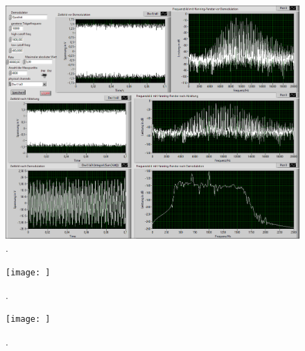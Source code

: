 \documentclass[
a4paper,
12pt,
pagesize,
ngerman
]{scrartcl}
\begin{document}
	\begin{figure}[h]
		\centering
		\includegraphics[width=1.0\textwidth]{EIRE2018Dateien/Tag4/OsziFMPM-Demod/mitBandpassUndIntegrationBilder/OsziPlusFMPMp}
		\caption{.}
	\end{figure}

	\begin{figure}[h] %
		\centering
		\texttt{[image: ]}
		\caption{.}
	\end{figure}

	\begin{figure}[h] %
		\centering
		\texttt{[image: ]}
		\caption{.}
	\end{figure}
	
	
\end{document}
